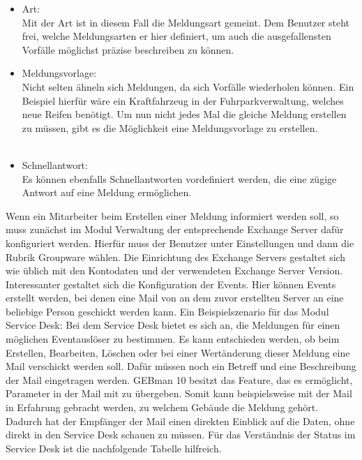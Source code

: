 \begin{itemize}[itemsep=10pt]
\item Art:\\
		Mit der Art ist in diesem Fall die Meldungsart gemeint. Dem Benutzer steht frei, welche 
		Meldungsarten er hier definiert, um auch die ausgefallensten Vorfälle möglichst präzise beschreiben zu 
		können.  \\
		 
\item Meldungsvorlage:\\
		Nicht selten ähneln sich Meldungen, da sich Vorfälle wiederholen können. Ein Beispiel hierfür wäre ein 
		Kraftfahrzeug in der Fuhrparkverwaltung, welches neue Reifen benötigt. Um nun nicht jedes Mal die 
		gleiche Meldung erstellen zu müssen, gibt es die Möglichkeit eine Meldungsvorlage zu erstellen. \\\\
		
\item Schnellantwort:\\
		Es können ebenfalls Schnellantworten vordefiniert werden, die eine zügige Antwort auf eine Meldung 
		ermöglichen.\\		
\end{itemize}

\noindent
Wenn ein Mitarbeiter beim Erstellen einer Meldung informiert werden soll, so muss zunächst im Modul Verwaltung der entsprechende Exchange Server dafür konfiguriert werden. Hierfür muss der Benutzer unter Einstellungen und dann die Rubrik Groupware wählen. Die Einrichtung des Exchange Servers gestaltet sich wie üblich mit den Kontodaten und der verwendeten Exchange Server Version.\newline
Interessanter gestaltet sich die Konfiguration der Events. Hier können Events erstellt werden, bei denen eine Mail von an dem zuvor erstellten Server an eine beliebige Person geschickt werden kann. Ein Beispielszenario für das Modul Service Desk:\newline
Bei dem Service Desk bietet es sich an, die Meldungen für einen möglichen Eventauslöser zu bestimmen. Es kann entschieden werden, ob beim Erstellen, Bearbeiten, Löschen oder bei einer Wertänderung dieser Meldung eine Mail verschickt werden soll. Dafür müssen noch ein Betreff und eine Beschreibung der Mail eingetragen werden. GEBman 10 besitzt das Feature, das es ermöglicht, Parameter in der Mail mit zu übergeben. Somit kann beispielsweise mit der Mail in Erfahrung gebracht werden, zu welchem Gebäude die Meldung gehört. Dadurch hat der Empfänger der Mail einen direkten Einblick auf die Daten, ohne direkt in den Service Desk schauen zu müssen.\newline
Für das Verständnis der Status im Service Desk ist die nachfolgende Tabelle hilfreich.\\

